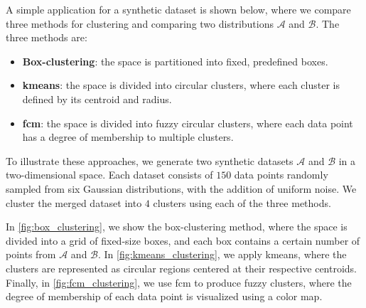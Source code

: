 \begin{modified}
\noindent A simple application for a synthetic dataset is shown below, where we compare three methods for clustering and comparing two distributions $\mathcal{A}$ and $\mathcal{B}$. The three methods are:
\begin{itemize}
	\item \textbf{Box-clustering}: the space is partitioned into fixed, predefined boxes.
	\item \textbf{\gls{kmeans}}: the space is divided into circular clusters, where each cluster is defined by its centroid and radius.
	\item \textbf{\gls{fcm}}: the space is divided into fuzzy circular clusters, where each data point has a degree of membership to multiple clusters.
\end{itemize}

\noindent To illustrate these approaches, we generate two synthetic datasets $\mathcal{A}$ and $\mathcal{B}$ in a two-dimensional space. Each dataset consists of $150$ data points randomly sampled from six Gaussian distributions, with the addition of uniform noise. We cluster the merged dataset into $4$ clusters using each of the three methods.

\noindent In \cref{fig:box_clustering}, we show the box-clustering method, where the space is divided into a grid of fixed-size boxes, and each box contains a certain number of points from $\mathcal{A}$ and $\mathcal{B}$. In \cref{fig:kmeans_clustering}, we apply \gls{kmeans}, where the clusters are represented as circular regions centered at their respective centroids. Finally, in \cref{fig:fcm_clustering}, we use \gls{fcm} to produce fuzzy clusters, where the degree of membership of each data point is visualized using a color map.


\end{modified}
